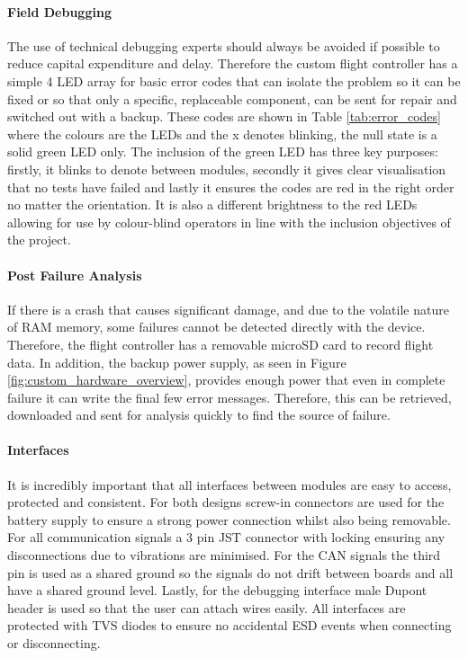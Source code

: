\paragraph{Field Debugging}
The use of technical debugging experts should always be avoided if possible to reduce capital expenditure and delay. Therefore the custom flight controller has a simple 4 \gls{LED} array for basic error codes that can isolate the problem so it can be fixed or so that only a specific, replaceable component, can be sent for repair and switched out with a backup. These codes are shown in Table \ref{tab:error_codes} where the colours are the \gls{LED}s and the x denotes blinking, the null state is a solid green \gls{LED} only.  The inclusion of the green LED has three key purposes: firstly, it blinks to denote between modules, secondly it gives clear visualisation that no tests have failed and lastly it ensures the codes are red in the right order no matter the orientation. It is also a different brightness to the red \gls{LED}s allowing for use by colour-blind operators in line with the inclusion objectives of the project.

\paragraph{Post Failure Analysis}
If there is a crash that causes significant damage, and due to the volatile nature of \gls{RAM} memory, some failures cannot be detected directly with the device. Therefore, the flight controller has a removable microSD card to record flight data. In addition, the backup power supply, as seen in Figure \ref{fig:custom_hardware_overview}, provides enough power that even in complete failure it can write the final few error messages. Therefore, this can be retrieved, downloaded and sent for analysis quickly to find the source of failure.
\paragraph{Interfaces}
It is incredibly important that all interfaces between modules are easy to access, protected and consistent. For both designs screw-in connectors are used for the battery supply to ensure a strong power connection whilst also being removable. For all communication signals a 3 pin JST connector with locking ensuring any disconnections due to vibrations are minimised. For the \gls{CAN} signals the third pin is used as a shared ground so the signals do not drift between boards and all have a shared ground level. Lastly, for the debugging interface male Dupont header is used so that the user can attach wires easily. All interfaces are protected with \gls{TVS} diodes to ensure no accidental \gls{ESD} events when connecting or disconnecting. 